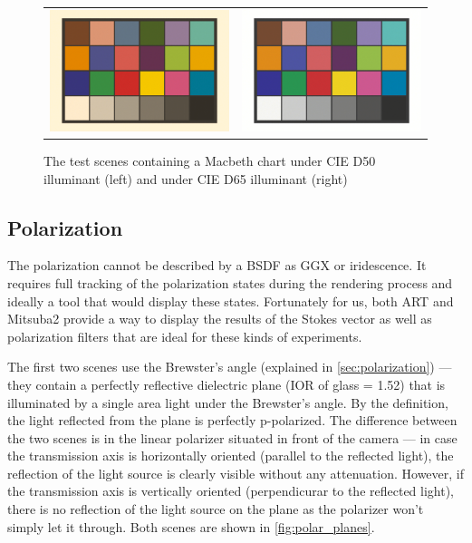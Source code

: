 \begin{figure}[h]
	\begin{tabular}{cc}
		\includegraphics[width=.45\linewidth]{img/macbeth_chart_D50.png}
		&
		\includegraphics[width=.45\linewidth]{img/macbeth_chart_D65.png}
	\end{tabular}
	\caption{The test scenes containing a Macbeth chart under CIE D50 illuminant (left) and under CIE D65 illuminant (right)}
	\label{fig:macbeth}
\end{figure}

\subsection{Polarization}

The polarization cannot be described by a BSDF as GGX or iridescence. It requires full tracking of the polarization states during the rendering process and ideally a tool that would display these states. Fortunately for us, both ART and Mitsuba2 provide a way to display the results of the Stokes vector as well as polarization filters that are ideal for these kinds of experiments.

The first two scenes use the Brewster's angle (explained in \autoref{sec:polarization}) --- they contain a perfectly reflective dielectric plane (IOR of glass = 1.52) that is illuminated by a single area light under the Brewster's angle. By the definition, the light reflected from the plane is perfectly p-polarized. The difference between the two scenes is in the linear polarizer situated in front of the camera --- in case the transmission axis is horizontally oriented (parallel to the reflected light), the reflection of the light source is clearly visible without any attenuation. However, if the transmission axis is vertically oriented (perpendicurar to the reflected light), there is no reflection of the light source on the plane as the polarizer won't simply let it through. Both scenes are shown in \autoref{fig:polar_planes}.

